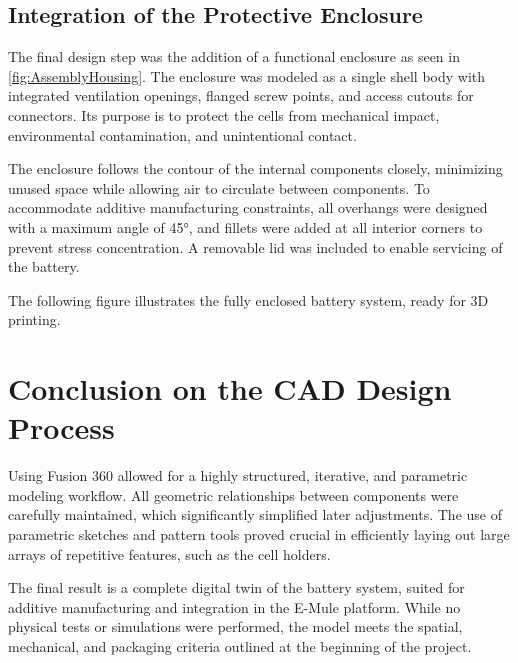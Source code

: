 \subsection{Integration of the Protective Enclosure}

\addtocounter{page}{1}
The final design step was the addition of a functional enclosure as seen in \ref{fig:AssemblyHousing}. The enclosure was modeled as a single shell body with integrated ventilation openings, flanged screw points, and access cutouts for connectors. Its purpose is to protect the cells from mechanical impact, environmental contamination, and unintentional contact.

The enclosure follows the contour of the internal components closely, minimizing unused space while allowing air to circulate between components. To accommodate additive manufacturing constraints, all overhangs were designed with a maximum angle of 45°, and fillets were added at all interior corners to prevent stress concentration. A removable lid was included to enable servicing of the battery.

The following figure illustrates the fully enclosed battery system, ready for 3D printing.



\section{Conclusion on the CAD Design Process}

Using Fusion 360 allowed for a highly structured, iterative, and parametric modeling workflow. All geometric relationships between components were carefully maintained, which significantly simplified later adjustments. The use of parametric sketches and pattern tools proved crucial in efficiently laying out large arrays of repetitive features, such as the cell holders.

The final result is a complete digital twin of the battery system, suited for additive manufacturing and integration in the E-Mule platform. While no physical tests or simulations were performed, the model meets the spatial, mechanical, and packaging criteria outlined at the beginning of the project.

